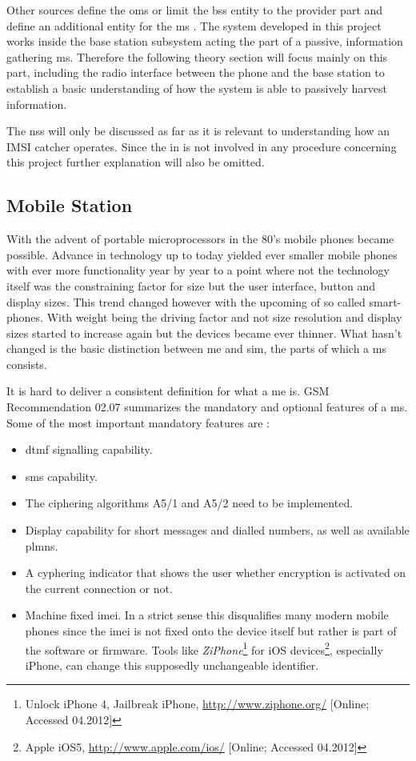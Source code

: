 Other sources define the \gls{oms} \cite{GSM2009} or limit the \gls{bss} entity to the provider part and define an additional entity for the \gls{ms} \cite{overview1994, overview1996}.
The system developed in this project works inside the base station subsystem acting the part of a passive, information gathering \gls{ms}.
Therefore the following theory section will focus mainly on this part, including the radio interface between the phone and the base station to establish a basic understanding of how the system is able to passively harvest information.

The \gls{nss} will only be discussed as far as it is relevant to understanding how an IMSI catcher operates.
Since the \gls{in} is not involved in any procedure concerning this project further explanation will also be omitted.

\subsection{Mobile Station}
\label{sec:ms}
With the advent of portable microprocessors in the 80's mobile phones became possible.
Advance in technology up to today yielded ever smaller mobile phones with ever more functionality year by year to a point where not the technology itself was the constraining factor for size but the user interface, \eg button and display sizes.
This trend changed however with the upcoming of so called smart-phones. 
With weight being the driving factor and not size resolution and display sizes started to increase again but the devices became ever thinner.
What hasn't changed is the basic distinction between \gls{me} and \gls{sim}, the parts of which a \gls{ms} consists.

It is hard to deliver a consistent definition for what a \gls{me} is.
GSM Recommendation 02.07 \cite{GSM0207} summarizes the mandatory and optional features of a \gls{ms}.
Some of the most important mandatory features are \cite{protocols1999}:
\begin{itemize}
	\item \gls{dtmf} signalling capability.
	\item \gls{sms} capability.
	\item The ciphering algorithms A5/1 and A5/2 need to be implemented.
	\item Display capability for short messages and dialled numbers, as well as available \gls{plmn}s.
	\item A cyphering indicator that shows the user whether encryption is activated on the current connection or not.
	\item Machine fixed \gls{imei}.
	In a strict sense this disqualifies many modern mobile phones since the \gls{imei} is not fixed onto the device itself but rather is part of the software or firmware.
	Tools like \emph{ZiPhone}\footnote{Unlock iPhone 4, Jailbreak iPhone, \url{http://www.ziphone.org/} [Online; Accessed 04.2012]} for iOS devices\footnote{Apple iOS5, \url{http://www.apple.com/ios/} [Online; Accessed 04.2012]}, especially iPhone, can change this supposedly unchangeable identifier.
\end{itemize}

